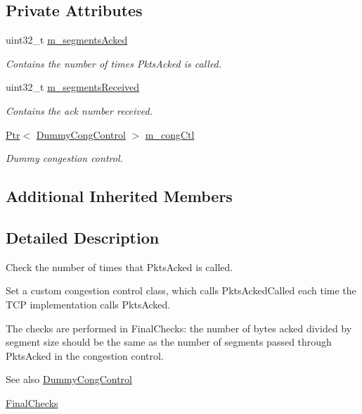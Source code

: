 \subsection*{Private Attributes}
\begin{DoxyCompactItemize}
\item 
uint32\+\_\+t \hyperlink{classTcpPktsAckedOpenTest_a2f728e94faf7afe3de132209f345f605}{m\+\_\+segments\+Acked}
\begin{DoxyCompactList}\small\item\em Contains the number of times Pkts\+Acked is called. \end{DoxyCompactList}\item 
uint32\+\_\+t \hyperlink{classTcpPktsAckedOpenTest_aebb57f034188608f80f001e0dda8d2c8}{m\+\_\+segments\+Received}
\begin{DoxyCompactList}\small\item\em Contains the ack number received. \end{DoxyCompactList}\item 
\hyperlink{classns3_1_1Ptr}{Ptr}$<$ \hyperlink{classDummyCongControl}{Dummy\+Cong\+Control} $>$ \hyperlink{classTcpPktsAckedOpenTest_a402ad0dd9350721c52687b8198ccab7d}{m\+\_\+cong\+Ctl}
\begin{DoxyCompactList}\small\item\em Dummy congestion control. \end{DoxyCompactList}\end{DoxyCompactItemize}
\subsection*{Additional Inherited Members}


\subsection{Detailed Description}
Check the number of times that Pkts\+Acked is called. 

Set a custom congestion control class, which calls Pkts\+Acked\+Called each time the T\+CP implementation calls Pkts\+Acked.

The checks are performed in Final\+Checks\+: the number of bytes acked divided by segment size should be the same as the number of segments passed through Pkts\+Acked in the congestion control.

\begin{DoxySeeAlso}{See also}
\hyperlink{classDummyCongControl}{Dummy\+Cong\+Control} 

\hyperlink{classTcpPktsAckedOpenTest_a50f6bcadd171cb448b352d50777bec2b}{Final\+Checks} 
\end{DoxySeeAlso}


